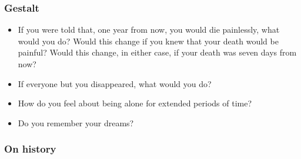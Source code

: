 \hypertarget{gestalt}{%
\subsubsection*{Gestalt}\label{gestalt}}

\begin{itemize}
\tightlist
\item
  If you were told that, one year from now, you would die painlessly, what would you do? Would this change if you knew that your death would be painful? Would this change, in either case, if your death was seven days from now?
\item
  If everyone but you disappeared, what would you do?
\item
  How do you feel about being alone for extended periods of time?
\item
  Do you remember your dreams?
\end{itemize}

\vspace{-2em}

\hypertarget{on-history}{%
\subsubsection*{On history}\label{on-history}}

